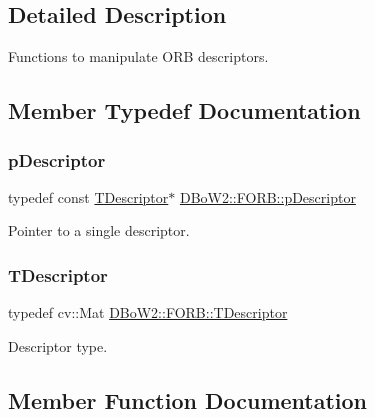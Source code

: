 \subsection{Detailed Description}
Functions to manipulate O\+RB descriptors. 

\subsection{Member Typedef Documentation}
\mbox{\label{class_d_bo_w2_1_1_f_o_r_b_ab52a6568044027cf30c8ac1514fed1a6}} 
\subsubsection{\texorpdfstring{p\+Descriptor}{pDescriptor}}
{\footnotesize\ttfamily typedef const \mbox{\hyperlink{class_d_bo_w2_1_1_f_o_r_b_aef9b966d0293836fab9f55f1799ce0ed}{T\+Descriptor}}$\ast$ \mbox{\hyperlink{class_d_bo_w2_1_1_f_o_r_b_ab52a6568044027cf30c8ac1514fed1a6}{D\+Bo\+W2\+::\+F\+O\+R\+B\+::p\+Descriptor}}}



Pointer to a single descriptor. 

\mbox{\label{class_d_bo_w2_1_1_f_o_r_b_aef9b966d0293836fab9f55f1799ce0ed}} 
\subsubsection{\texorpdfstring{T\+Descriptor}{TDescriptor}}
{\footnotesize\ttfamily typedef cv\+::\+Mat \mbox{\hyperlink{class_d_bo_w2_1_1_f_o_r_b_aef9b966d0293836fab9f55f1799ce0ed}{D\+Bo\+W2\+::\+F\+O\+R\+B\+::\+T\+Descriptor}}}



Descriptor type. 



\subsection{Member Function Documentation}
\mbox{\label{class_d_bo_w2_1_1_f_o_r_b_ac166ab6808abc7c385dbaabfacfed38c}} 
